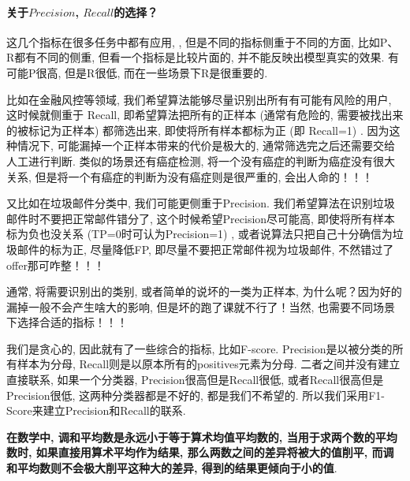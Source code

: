 \paragraph*{关于$Precision$, $Recall$的选择？}这几个指标在很多任务中都有应用, , 但是不同的指标侧重于不同的方面, 比如P、R都有不同的侧重, 但看一个指标是比较片面的, 并不能反映出模型真实的效果. 有可能P很高, 但是R很低, 而在一些场景下R是很重要的. 

比如在金融风控等领域, 我们希望算法能够尽量识别出所有有可能有风险的用户, 这时候就侧重于 Recall, 即希望算法把所有的正样本 (通常有危险的, 需要被找出来的被标记为正样本) 都筛选出来, 即使将所有样本都标为正 (即 Recall=1) . 因为这种情况下, 可能漏掉一个正样本带来的代价是极大的, 通常筛选完之后还需要交给人工进行判断. 类似的场景还有癌症检测, 将一个没有癌症的判断为癌症没有很大关系, 但是将一个有癌症的判断为没有癌症则是很严重的, 会出人命的！！！

又比如在垃圾邮件分类中, 我们可能更侧重于Precision. 我们希望算法在识别垃圾邮件时不要把正常邮件错分了, 这个时候希望Precision尽可能高, 即使将所有样本标为负也没关系 (TP=0时可认为Precision=1) , 或者说算法只把自己十分确信为垃圾邮件的标为正, 尽量降低FP, 即尽量不要把正常邮件视为垃圾邮件, 不然错过了offer那可咋整！！！

通常, 将需要识别出的类别, 或者简单的说坏的一类为正样本, 为什么呢？因为好的漏掉一般不会产生啥大的影响, 但是坏的跑了课就不行了！当然, 也需要不同场景下选择合适的指标！！！

我们是贪心的, 因此就有了一些综合的指标, 比如F-score. 
Precision是以被分类的所有样本为分母, Recall则是以原本所有的positives元素为分母. 二者之间并没有建立直接联系, 如果一个分类器, Precision很高但是Recall很低, 或者Recall很高但是Precision很低, 这两种分类器都是不好的, 都是我们不希望的. 所以我们采用F1-Score来建立Precision和Recall的联系. 

\textbf{在数学中, 调和平均数是永远小于等于算术均值平均数的, 当用于求两个数的平均数时, 如果直接用算术平均作为结果, 那么两数之间的差异将被大的值削平, 而调和平均数则不会极大削平这种大的差异, 得到的结果更倾向于小的值}. 

